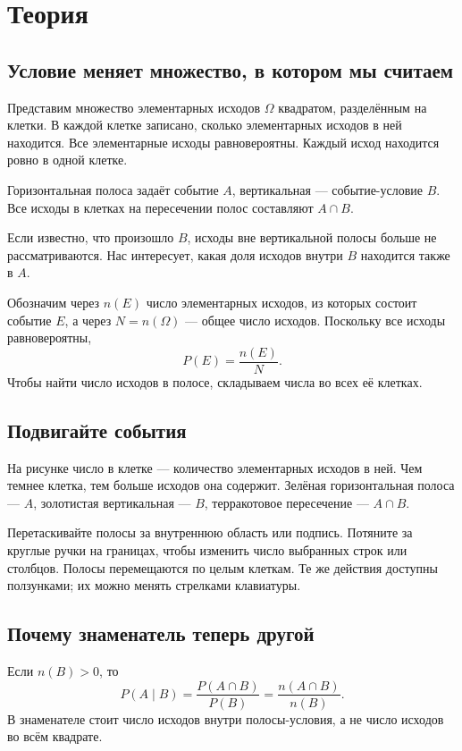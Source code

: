 \section{Теория}

\subsection{Условие меняет множество, в котором мы считаем}
Представим множество элементарных исходов $\Omega$ квадратом, разделённым на клетки. В каждой клетке записано, сколько элементарных исходов в ней находится. Все элементарные исходы равновероятны. Каждый исход находится ровно в одной клетке.

Горизонтальная полоса задаёт событие $A$, вертикальная — событие-условие $B$. Все исходы в клетках на пересечении полос составляют $A\cap B$.

Если известно, что произошло $B$, исходы вне вертикальной полосы больше не рассматриваются. Нас интересует, какая доля исходов внутри $B$ находится также в $A$.

\begin{definition}
Обозначим через $n(E)$ число элементарных исходов, из которых состоит событие $E$, а через $N=n(\Omega)$ — общее число исходов. Поскольку все исходы равновероятны,
\[
 P(E)=\frac{n(E)}{N}.
\]
Чтобы найти число исходов в полосе, складываем числа во всех её клетках.
\end{definition}

\subsection{Подвигайте события}
На рисунке число в клетке — количество элементарных исходов в ней. Чем темнее клетка, тем больше исходов она содержит. Зелёная горизонтальная полоса — $A$, золотистая вертикальная — $B$, терракотовое пересечение — $A\cap B$.

Перетаскивайте полосы за внутреннюю область или подпись. Потяните за круглые ручки на границах, чтобы изменить число выбранных строк или столбцов. Полосы перемещаются по целым клеткам. Те же действия доступны ползунками; их можно менять стрелками клавиатуры.


\subsection{Почему знаменатель теперь другой}
\begin{definition}
Если $n(B)>0$, то
\[
 P(A\mid B)=\frac{P(A\cap B)}{P(B)}=\frac{n(A\cap B)}{n(B)}.
\]
В знаменателе стоит число исходов внутри полосы-условия, а не число исходов во всём квадрате.
\end{definition}

